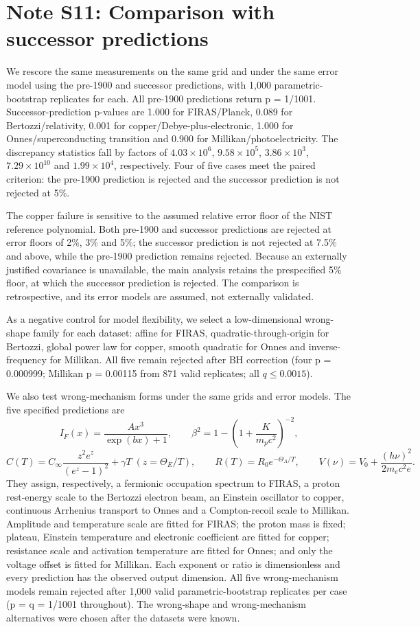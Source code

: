 \documentclass{article}
\begin{document}
\section{Note S11: Comparison with successor predictions}

We rescore the same measurements on the same grid and under the same error model using the pre-1900 and successor predictions, with 1,000 parametric-bootstrap replicates for each. All pre-1900 predictions return p = 1/1001. Successor-prediction p-values are 1.000 for FIRAS/Planck, 0.089 for Bertozzi/relativity, 0.001 for copper/Debye-plus-electronic, 1.000 for Onnes/superconducting transition and 0.900 for Millikan/photoelectricity. The discrepancy statistics fall by factors of $4.03\times10^{6}$, $9.58\times10^{5}$, $3.86\times10^{3}$, $7.29\times10^{10}$ and $1.99\times10^{4}$, respectively. Four of five cases meet the paired criterion: the pre-1900 prediction is rejected and the successor prediction is not rejected at 5\%.

The copper failure is sensitive to the assumed relative error floor of the NIST reference polynomial. Both pre-1900 and successor predictions are rejected at error floors of 2\%, 3\% and 5\%; the successor prediction is not rejected at 7.5\% and above, while the pre-1900 prediction remains rejected. Because an externally justified covariance is unavailable, the main analysis retains the prespecified 5\% floor, at which the successor prediction is rejected. The comparison is retrospective, and its error models are assumed, not externally validated.

As a negative control for model flexibility, we select a low-dimensional wrong-shape family for each dataset: affine for FIRAS, quadratic-through-origin for Bertozzi, global power law for copper, smooth quadratic for Onnes and inverse-frequency for Millikan. All five remain rejected after BH correction (four p = 0.000999; Millikan p = 0.00115 from 871 valid replicates; all $q \leq 0.0015$).

We also test wrong-mechanism forms under the same grids and error models. The five specified predictions are
\[
I_F(x)=\frac{A x^3}{\exp(bx)+1},\qquad
\beta^2=1-\left(1+\frac{K}{m_pc^2}\right)^{-2},
\]
\[
C(T)=C_\infty\frac{z^2e^z}{(e^z-1)^2}+\gamma T\;(z=\Theta_E/T),\qquad
R(T)=R_0e^{-\Theta_A/T},\qquad
V(\nu)=V_0+\frac{(h\nu)^2}{2m_ec^2e}.
\]
They assign, respectively, a fermionic occupation spectrum to FIRAS, a proton rest-energy scale to the Bertozzi electron beam, an Einstein oscillator to copper, continuous Arrhenius transport to Onnes and a Compton-recoil scale to Millikan. Amplitude and temperature scale are fitted for FIRAS; the proton mass is fixed; plateau, Einstein temperature and electronic coefficient are fitted for copper; resistance scale and activation temperature are fitted for Onnes; and only the voltage offset is fitted for Millikan. Each exponent or ratio is dimensionless and every prediction has the observed output dimension. All five wrong-mechanism models remain rejected after 1,000 valid parametric-bootstrap replicates per case (p = q = 1/1001 throughout). The wrong-shape and wrong-mechanism alternatives were chosen after the datasets were known.
\end{document}
